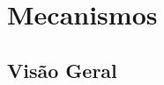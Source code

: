 \documentclass[xcolor=svgnames]{beamer}
\begin{document}


\section{Mecanismos}
\subsection{Visão Geral}
\end{document}
